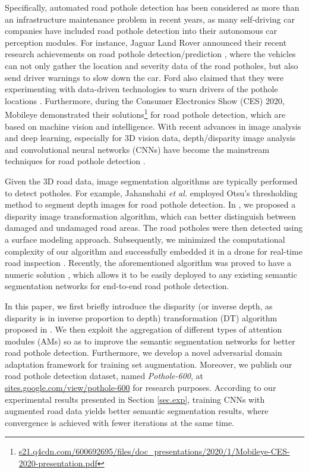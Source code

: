 \documentclass[runningheads]{llncs}
\newcommand{\etal}{\textit{et al.}}
\begin{document}
Specifically, automated road pothole detection has been considered as more than an infrastructure maintenance problem in recent years, as many self-driving car companies have included road pothole detection into their autonomous car perception modules. For instance, Jaguar Land Rover announced their recent research achievements on road pothole detection/prediction \cite{land_rover_pothole}, where the vehicles can not only gather the location and severity data of the road potholes, but also send driver warnings to slow down the car. Ford also claimed that they were experimenting with data-driven technologies to warn drivers of the pothole locations \cite{ford_pothole}. Furthermore, during the Consumer Electronics Show (CES) 2020, Mobileye demonstrated their solutions\footnote{\url{s21.q4cdn.com/600692695/files/doc_presentations/2020/1/Mobileye-CES-2020-presentation.pdf}} for road pothole detection, which are based on machine vision and intelligence. With recent advances in image analysis and deep learning, especially for 3D vision data, depth/disparity image analysis and convolutional neural networks (CNNs) have become the mainstream techniques  for road pothole detection \cite{fan2019real}.

Given the 3D road data, image segmentation algorithms are typically performed to detect potholes. For example, Jahanshahi {\etal} \cite{jahanshahi2013unsupervised} employed Otsu's thresholding method \cite{otsu1979threshold} to segment depth images for road pothole detection. In \cite{fan2019pothole}, we proposed a disparity image transformation algorithm, which can better distinguish between damaged and undamaged road areas. The road potholes were then detected using a surface modeling approach. Subsequently, we minimized the computational complexity of our algorithm and successfully embedded it in a drone for real-time road inspection \cite{fan2019real}. Recently, the aforementioned algorithm was proved to have a numeric solution \cite{fan2019road}, which allows it to be easily deployed to any existing semantic segmentation networks for end-to-end road pothole detection.

In this paper, we first briefly introduce the disparity (or inverse depth, as disparity is in inverse proportion to depth) transformation (DT) algorithm proposed in \cite{fan2019road}. We then exploit the aggregation of different types of attention modules (AMs) so as to improve the semantic segmentation networks for better road pothole detection. Furthermore, we develop a novel adversarial domain adaptation framework for training set augmentation. Moreover, we publish our road pothole detection dataset, named \textit{Pothole-600}, at \url{sites.google.com/view/pothole-600} for research purposes. According to our experimental results presented in Section \ref{sec.exp}, training CNNs with augmented road data  yields better semantic segmentation results, where convergence is achieved with fewer iterations at the same time.
\end{document}
